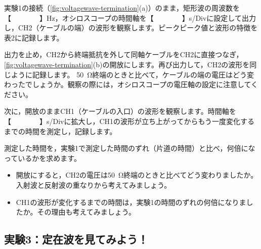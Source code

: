 \begin{procedure}[label=\textbf{(\arabic*)}, ref=(\arabic*), leftmargin=*, labelsep=0.8em]
  \item 実験1の接続（\cref{fig:voltagewave-termination}(a)）のまま，矩形波の周波数を【　　　　】Hz，オシロスコープの時間軸を【　　　　】s/Divに設定して出力し，CH2（ケーブルの端）の波形を観察します。ピークピーク値と波形の特徴を表2に記録します。
  \item 出力を止め，CH2から終端抵抗を外して同軸ケーブルをCH2に直接つなぎ，\cref{fig:voltagewave-termination}(b)の開放にします。再び出力して，CH2の波形を同じように記録します。  \SI{50}{\ohm}終端のときと比べて，ケーブルの端の電圧はどう変わったでしょうか。観察の際には，オシロスコープの電圧軸の設定に注意してください。
  \item 次に，開放のままCH1（ケーブルの入口）の波形を観察します。時間軸を【　　　　】s/Divに拡大し，CH1の波形が立ち上がってからもう一度変化するまでの時間を測定し，記録します。
  \item 測定した時間を，実験1で測定した時間のずれ（片道の時間）と比べ，何倍になっているかを求めます。
\end{procedure}

\begin{kakunin}[考えてみよう]
\begin{itemize}
  \item 開放にすると，CH2の電圧は\SI{50}{\ohm}終端のときと比べてどう変わりましたか。入射波と反射波の重なりから考えてみましょう。
  \item CH1の波形が変化するまでの時間は，実験1の時間のずれの何倍になりましたか。その理由も考えてみましょう。
\end{itemize}
\end{kakunin}

\subsection{実験3：定在波を見てみよう！}

